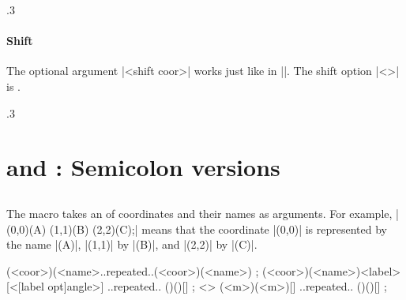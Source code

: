 \begin{tzcode}{.3}
\end{tzcode}

\paragraph{Shift} The optional argument |<shift coor>| works just like in |\tzcoor|.
The  shift option |<>| is .

\begin{tzcode}{.3}
\end{tzcode}

\section{\protect\cmd{\tzcoors} and \protect\cmd{\tzcoors*}: Semicolon versions}
\label{s:tzcoors}

\subsection{\protect\cmd{\tzcoors}}
\label{ss:tzcoors}

The macro \icmd{\tzcoors} takes an  of coordinates and their names as arguments.
For example, |\tzcoors(0,0)(A) (1,1)(B) (2,2)(C);| means that the coordinate |(0,0)| is represented by the name |(A)|, |(1,1)| by |(B)|, and |(2,2)| by |(C)|.

\begin{tzdef}{}
\tzcoors(<coor>)(<name>..repeated..(<coor>)(<name>) ;
(<coor>)(<name>){<label>}[<[label opt]angle>] 
                     ..repeated.. ()(){}[] ;
  <> (<m>)(<m>){}[] ..repeated.. ()(){}[] ;
\end{tzdef}

